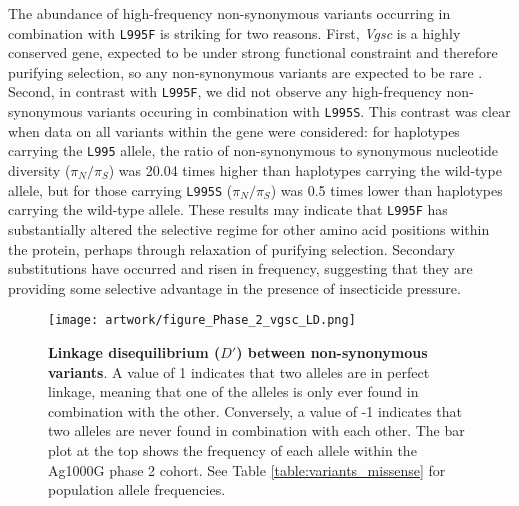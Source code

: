 \documentclass[a4paper,11pt,abstracton,hidelinks]{scrartcl}
\begin{document}
The abundance of high-frequency non-synonymous variants occurring in combination with \texttt{L995F} is striking for two reasons.
%
First, \textit{Vgsc} is a highly conserved gene, expected to be under strong functional constraint and therefore purifying selection, so any non-synonymous variants are expected to be rare \cite{Davies2007b}.
%
Second, in contrast with \texttt{L995F}, we did not observe any high-frequency non-synonymous variants occuring in combination with \texttt{L995S}.
%
This contrast was clear when data on all variants within the gene were considered: for haplotypes carrying the \texttt{L995} allele, the ratio of non-synonymous to synonymous nucleotide diversity ($\pi_{N}/\pi_{S}$) was 20.04 times higher than haplotypes carrying the wild-type allele, but for those carrying \texttt{L995S} ($\pi_{N}/\pi_{S}$) was 0.5 times lower than haplotypes carrying the wild-type allele.
%
These results may indicate that \texttt{L995F} has substantially altered the selective regime for other amino acid positions within the protein, perhaps through relaxation of purifying selection.
%
Secondary substitutions have occurred and risen in frequency, suggesting that they are providing some selective advantage in the presence of insecticide pressure.


%
\begin{figure}[!t]

  \centering

  \texttt{[image: artwork/figure\_Phase\_2\_vgsc\_LD.png]}

  \caption{\textbf{Linkage disequilibrium ($D'$) between non-synonymous variants}. A value of 1 indicates that two alleles are in perfect linkage, meaning that one of the alleles is only ever found in combination with the other. Conversely, a value of -1 indicates that two alleles are never found in combination with each other. The bar plot at the top shows the frequency of each allele within the Ag1000G phase 2 cohort. See Table \ref{table:variants_missense} for population allele frequencies.}

  \label{fig:ld}

\end{figure}
\end{document}
